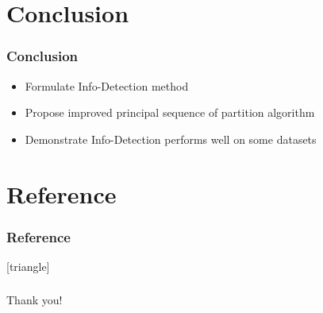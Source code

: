\documentclass[notheorems]{beamer}
\begin{document}
\section{Conclusion}
\begin{frame}
\frametitle{Conclusion}
\begin{itemize}
\item Formulate Info-Detection method
\item Propose improved principal sequence of partition algorithm 
\item Demonstrate Info-Detection performs well on some datasets
\end{itemize}
\end{frame}
\section*{Reference}
\begin{frame}
\frametitle{Reference}
[triangle]

{\scriptsize

}
\end{frame}
\begin{frame}
\frametitle{}
\begin{block}{}
\centering
Thank you!
\end{block}
\end{frame}
\end{document}
